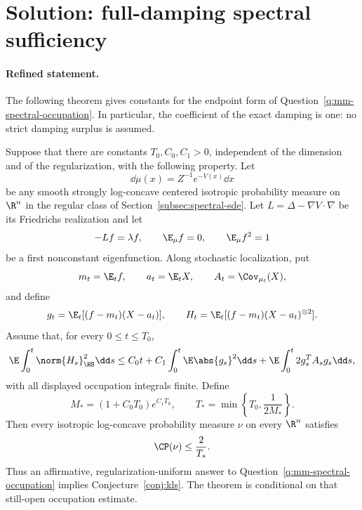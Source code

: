 \documentclass[../main.tex]{subfiles}
\begin{document}
%
\section*{Solution: full-damping spectral sufficiency}
\label{sec:sol-prop-spectral-sufficiency}

\paragraph{Refined statement.}
The following theorem gives constants for the endpoint form of
Question~\ref{q:mm-spectral-occupation}.  In particular, the coefficient of the exact damping
is one: no strict damping surplus is assumed.

\begin{theorem}
\label{thm:sol-prop-spectral-sufficiency}
Suppose that there are constants $T_0,C_0,C_1>0$, independent of the dimension and of the
regularization, with the following property.  Let
\[
  \dd\mu(x)=Z^{-1}e^{-V(x)}\dd x
\]
be any smooth strongly log-concave centered isotropic probability measure on $\R^n$ in the
regular class of Section~\ref{subsec:spectral-sde}.  Let
$L=\Delta-\nabla V\cdot\nabla$ be its Friedrichs realization and let
\[
  -Lf=\lambda f,
  \qquad \E_\mu f=0,
  \qquad \E_\mu f^2=1
\]
be a first nonconstant eigenfunction.  Along stochastic localization, put
\[
  m_t=\E_tf,
  \qquad
  a_t=\E_tX,
  \qquad
  A_t=\Cov_{\mu_t}(X),
\]
and define
\[
  g_t=\E_t[(f-m_t)(X-a_t)],
  \qquad
  H_t=\E_t[(f-m_t)(X-a_t)^{\otimes2}].
\]
Assume that, for every $0\le t\le T_0$,
\begin{equation}
  \E\int_0^t\norm{H_s}_{\HS}^2\dd s
  \le C_0t+C_1\int_0^t\E\abs{g_s}^2\dd s
     +\E\int_0^t2g_s^TA_sg_s\dd s,
  \label{eq:sol-spectral-occupation-hypothesis}
\end{equation}
with all displayed occupation integrals finite.
Define
\begin{equation}
  M_*=(1+C_0T_0)e^{C_1T_0},
  \qquad
  T_* = \min\left\{T_0,\frac1{2M_*}\right\}.
  \label{eq:sol-spectral-constants}
\end{equation}
Then every isotropic log-concave probability measure $\nu$ on every $\R^n$ satisfies
\begin{equation}
  \CP(\nu)\le \frac2{T_*}.
  \label{eq:sol-spectral-gap-conclusion}
\end{equation}
Thus an affirmative, regularization-uniform answer to
Question~\ref{q:mm-spectral-occupation} implies Conjecture~\ref{conj:kls}.
The theorem is conditional on that still-open occupation estimate.
\end{theorem}
\end{document}
